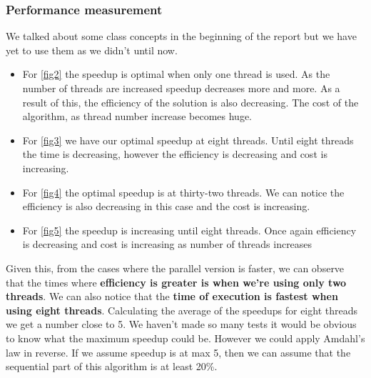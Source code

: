 \documentclass[10pt,journal,compsoc]{IEEEtran}
\begin{document}
\subsubsection{Performance measurement}
We talked about some class concepts in the beginning of the report but we have yet to use them as we didn't until now.
\begin{itemize}
    \item For \ref{fig2} the speedup is optimal when only one thread is used. As the number of threads are increased speedup decreases more and more. As a result of this, the efficiency of the solution is also decreasing. The cost of the algorithm, as thread number increase becomes huge.
    \item For \ref{fig3} we have our optimal speedup at eight threads. Until eight threads the time is decreasing, however the efficiency is decreasing and cost is increasing.
    \item For \ref{fig4} the optimal speedup is at thirty-two threads. We can notice the efficiency is also decreasing in this case and the cost is increasing.
    \item For \ref{fig5} the speedup is increasing until eight threads. Once again efficiency is decreasing and cost is increasing as number of threads increases
\end{itemize}

Given this, from the cases where the parallel version is faster, we can observe that the times where \textbf{efficiency is greater is when we're using only two threads}. We can also notice that the \textbf{time of execution is fastest when using eight threads}. Calculating the average of the speedups for eight threads we get a number close to 5. We haven't made so many tests it would be obvious to know what the maximum speedup could be. However we could apply Amdahl's law in reverse. If we assume speedup is at max 5, then we can assume that the sequential part of this algorithm is at least 20\%.
\end{document}
